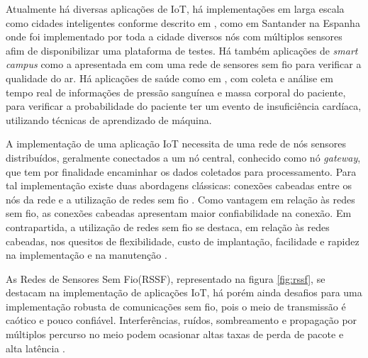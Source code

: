 Atualmente há diversas aplicações de IoT, há implementações em larga escala como cidades inteligentes conforme descrito em \cite{sotres2017practical}, como em Santander na Espanha onde foi implementado por toda a cidade diversos nós com múltiplos sensores afim de disponibilizar uma plataforma de testes. Há também aplicações de \emph{smart campus} como a apresentada em \cite{wang2017performance} com uma rede de sensores sem fio para verificar a qualidade do ar. Há aplicações de saúde como em \cite{zhang2015remote}, com coleta e análise em tempo real de informações de pressão sanguínea e massa corporal do paciente, para verificar a probabilidade do paciente ter um evento de insuficiência cardíaca, utilizando técnicas de aprendizado de máquina.


A implementação de uma aplicação IoT necessita de uma rede de nós sensores distribuídos, geralmente conectados a um nó central, conhecido como nó \emph{gateway}, que tem por finalidade encaminhar os dados coletados para processamento. Para tal implementação existe duas abordagens clássicas: conexões cabeadas entre os nós da rede e a utilização de redes sem fio \cite{gomes2017estimaccao}. Como vantagem em relação às redes sem fio, as conexões cabeadas apresentam maior confiabilidade na conexão. Em contrapartida, a utilização de redes sem fio se destaca, em relação às redes cabeadas, nos quesitos de flexibilidade, custo de implantação, facilidade e rapidez na implementação e na manutenção \cite{gungor2009industrial}.

As Redes de Sensores Sem Fio(RSSF), representado na figura \ref{fig:rssf}, se destacam na implementação de aplicações IoT, há porém ainda desafios para uma implementação robusta de comunicações sem fio, pois o meio de transmissão é caótico e pouco confiável. Interferências, ruídos, sombreamento e propagação por múltiplos percurso no meio podem ocasionar altas taxas de perda de pacote e alta latência \cite{gomes2017estimaccao}.

